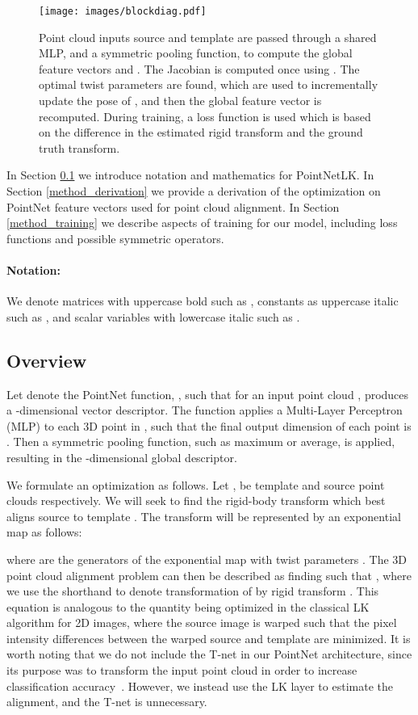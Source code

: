 \documentclass[10pt,twocolumn,letterpaper]{article}
\begin{document}
\begin{figure*}
\begin{center}
\texttt{[image: images/blockdiag.pdf]}
\end{center}
   \caption{Point cloud inputs source  and template  are passed through a shared MLP, and a symmetric pooling function, to compute the global feature vectors  and . The Jacobian  is computed once using . The optimal twist parameters are found, which are used to incrementally update the pose of , and then the global feature vector  is recomputed. During training, a loss function is used which is based on the difference in the estimated rigid transform and the ground truth transform.}
\label{fig_block}
\end{figure*}
In Section \ref{method_overview} we introduce notation and mathematics for PointNetLK. In Section \ref{method_derivation} we provide a derivation of the optimization on PointNet feature vectors used for point cloud alignment. In Section \ref{method_training} we describe aspects of training for our model, including loss functions and possible symmetric operators. 
\paragraph{Notation:} We denote matrices with uppercase bold such as , constants as uppercase italic such as , and scalar variables with lowercase italic such as .

\subsection{Overview} \label{method_overview}
Let  denote the PointNet function, 
\mbox{}, such that for an input point cloud ,   produces a -dimensional vector descriptor. The function  applies a Multi-Layer Perceptron (MLP) to each 3D point in , such that the final output dimension of each point is . Then a symmetric pooling function, such as maximum or average, is applied, resulting in the -dimensional global descriptor.

We formulate an optimization as follows. Let ,  be template and source point clouds respectively. We will seek to find the rigid-body transform  which best aligns source  to template . The transform  will be represented by an exponential map as follows:


where  are the generators of the exponential map with twist parameters . The 3D point cloud alignment problem can then be described as finding  such that , where we use the shorthand  to denote transformation of  by rigid transform . This equation is analogous to the quantity being optimized in the classical LK algorithm for 2D images, where the source image is warped such that the pixel intensity differences between the warped source and template are minimized.  It is worth noting that we do not include the T-net in our PointNet architecture, since its purpose was to transform the input point cloud in order to increase classification accuracy~\cite{qi2017pointnet}.   However,  we instead use the LK layer to estimate the alignment, and the T-net is unnecessary.
\end{document}
